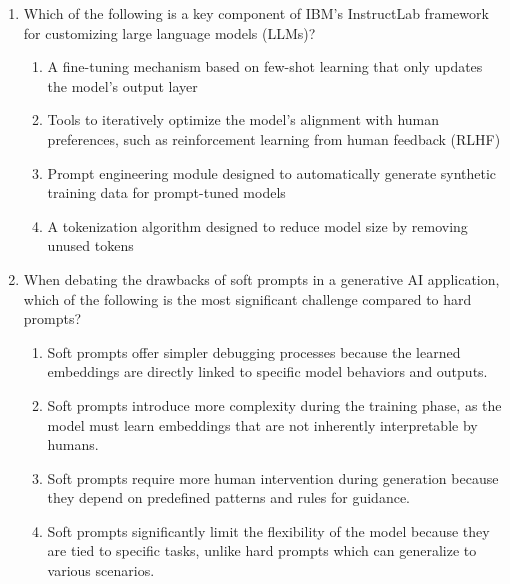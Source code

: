 \begin{enumerate}[resume,leftmargin=*]
\begin{enumerate}[label=\Alph*.]
  \item Randomly shuffle the sensitive data fields to prevent direct re-identification.
  \item Generate a synthetic version of the dataset that removes all PII automatically.
  \item Apply a differential privacy algorithm that ensures no individual data point can be traced back to a specific user.
  \item Use a hashing algorithm to replace PII fields while retaining the ability to reverse the process if needed.
\end{enumerate}
\item Which of the following is a key component of IBM's InstructLab framework for customizing large language models (LLMs)?
\begin{enumerate}[label=\Alph*.]
  \item A fine-tuning mechanism based on few-shot learning that only updates the model's output layer
  \item Tools to iteratively optimize the model's alignment with human preferences, such as reinforcement learning from human feedback (RLHF)
  \item Prompt engineering module designed to automatically generate synthetic training data for prompt-tuned models
  \item A tokenization algorithm designed to reduce model size by removing unused tokens
\end{enumerate}
\item When debating the drawbacks of soft prompts in a generative AI application, which of the following is the most significant challenge compared to hard prompts?
\begin{enumerate}[label=\Alph*.]
  \item Soft prompts offer simpler debugging processes because the learned embeddings are directly linked to specific model behaviors and outputs.
  \item Soft prompts introduce more complexity during the training phase, as the model must learn embeddings that are not inherently interpretable by humans.
  \item Soft prompts require more human intervention during generation because they depend on predefined patterns and rules for guidance.
  \item Soft prompts significantly limit the flexibility of the model because they are tied to specific tasks, unlike hard prompts which can generalize to various scenarios.

\end{enumerate}
\end{enumerate}
